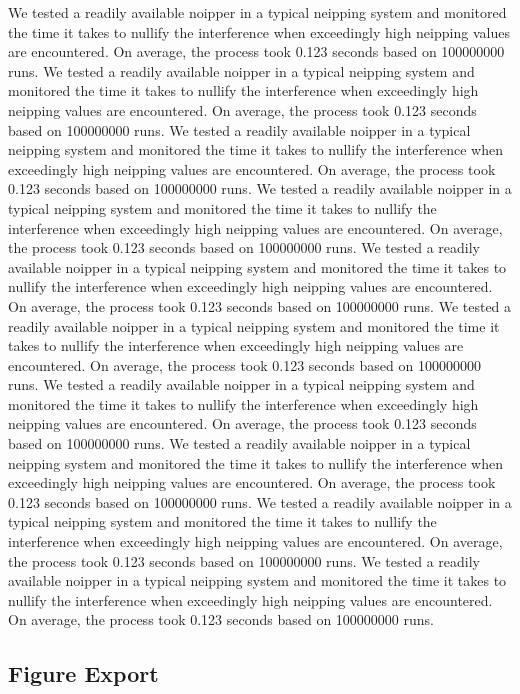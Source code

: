 We tested a readily available noipper in a typical neipping system and monitored the time it takes to nullify the interference when exceedingly high neipping values are encountered. On average, the process took 0.123 seconds based on 100000000 runs.  
We tested a readily available noipper in a typical neipping system and monitored the time it takes to nullify the interference when exceedingly high neipping values are encountered. On average, the process took 0.123 seconds based on 100000000 runs.  
We tested a readily available noipper in a typical neipping system and monitored the time it takes to nullify the interference when exceedingly high neipping values are encountered. On average, the process took 0.123 seconds based on 100000000 runs.  
We tested a readily available noipper in a typical neipping system and monitored the time it takes to nullify the interference when exceedingly high neipping values are encountered. On average, the process took 0.123 seconds based on 100000000 runs.  
We tested a readily available noipper in a typical neipping system and monitored the time it takes to nullify the interference when exceedingly high neipping values are encountered. On average, the process took 0.123 seconds based on 100000000 runs.  
We tested a readily available noipper in a typical neipping system and monitored the time it takes to nullify the interference when exceedingly high neipping values are encountered. On average, the process took 0.123 seconds based on 100000000 runs.  
We tested a readily available noipper in a typical neipping system and monitored the time it takes to nullify the interference when exceedingly high neipping values are encountered. On average, the process took 0.123 seconds based on 100000000 runs.  
We tested a readily available noipper in a typical neipping system and monitored the time it takes to nullify the interference when exceedingly high neipping values are encountered. On average, the process took 0.123 seconds based on 100000000 runs.  
We tested a readily available noipper in a typical neipping system and monitored the time it takes to nullify the interference when exceedingly high neipping values are encountered. On average, the process took 0.123 seconds based on 100000000 runs.  
We tested a readily available noipper in a typical neipping system and monitored the time it takes to nullify the interference when exceedingly high neipping values are encountered. On average, the process took 0.123 seconds based on 100000000 runs.  

\subsection{Figure Export}

